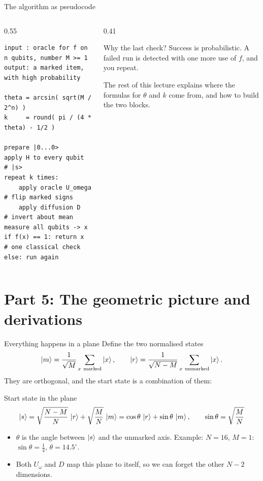 \documentclass[aspectratio=169,11pt]{beamer}
\newcommand{\Uo}{U_\omega}
\begin{document}
\begin{frame}[fragile]{The algorithm as pseudocode}
  \begin{columns}[T]
    \begin{column}{0.55\textwidth}
\begin{lstlisting}[language={}]
input : oracle for f on n qubits, number M >= 1
output: a marked item, with high probability

theta = arcsin( sqrt(M / 2^n) )
k     = round( pi / (4 * theta) - 1/2 )

prepare |0...0>
apply H to every qubit          # |s>
repeat k times:
    apply oracle U_omega        # flip marked signs
    apply diffusion D           # invert about mean
measure all qubits -> x
if f(x) == 1: return x          # one classical check
else: run again
\end{lstlisting}
    \end{column}
    \begin{column}{0.41\textwidth}
      \begin{block}{Why the last check?}
        Success is probabilistic. A failed run is detected with one more use of $f$, and you repeat.
      \end{block}
      \vspace{1mm}
      The rest of this lecture explains where the formulas for $\theta$ and $k$ come from, and how to build the two blocks.
    \end{column}
  \end{columns}
\end{frame}

\section{Part 5: The geometric picture and derivations}
\begin{frame}{Everything happens in a plane}
  Define the two normalised states
  \[ \ket{m} = \frac{1}{\sqrt M}\sum_{x\ \text{marked}}\ket{x}, \qquad \ket{r} = \frac{1}{\sqrt{N - M}}\sum_{x\ \text{unmarked}}\ket{x}. \]
  They are orthogonal, and the start state is a combination of them:
  \begin{block}{Start state in the plane}
    \[ \ket{s} = \sqrt{\frac{N - M}{N}}\,\ket{r} + \sqrt{\frac MN}\,\ket{m} = \cos\theta\,\ket{r} + \sin\theta\,\ket{m}, \qquad \sin\theta = \sqrt{\frac MN} \]
  \end{block}
  \begin{itemize}
    \item $\theta$ is the angle between $\ket{s}$ and the unmarked axis. Example: $N = 16$, $M = 1$: $\sin\theta = \frac14$, $\theta = 14.5^\circ$.
    \item Both $\Uo$ and $D$ map this plane to itself, so we can forget the other $N - 2$ dimensions.
  \end{itemize}
\end{frame}
\end{document}
